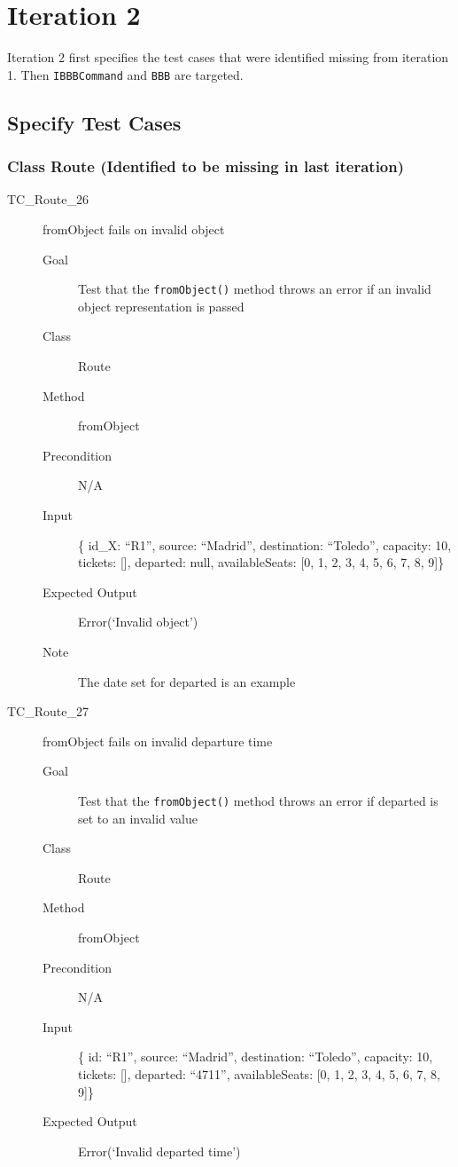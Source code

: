 \documentclass[11pt]{article}
\begin{document}
\section{Iteration 2}
\label{sec:org1440b24}

Iteration 2 first specifies the test cases that were identified missing from iteration 1. Then \texttt{IBBBCommand} and \texttt{BBB} are targeted.

\subsection{Specify Test Cases}
\label{sec:org25bcdb5}

\subsubsection{Class Route (Identified to be missing in last iteration)}
\label{sec:orgf850004}

\begin{description}
\item[{TC\_Route\_26}] fromObject fails on invalid object
\begin{description}
\item[{Goal}] Test that the \texttt{fromObject()} method throws an error if an invalid object representation is passed
\item[{Class}] Route
\item[{Method}] fromObject
\item[{Precondition}] N/A
\item[{Input}] \{ id\_X: “R1”, source: “Madrid”, destination: “Toledo”, capacity: 10,  tickets: [], departed: null, availableSeats: [0, 1, 2, 3, 4, 5, 6, 7, 8, 9]\}
\item[{Expected Output}] Error(‘Invalid object’)
\item[{Note}] The date set for departed is an example
\end{description}

\item[{TC\_Route\_27}] fromObject fails on invalid departure time
\begin{description}
\item[{Goal}] Test that the \texttt{fromObject()} method throws an error if departed is set to an invalid value
\item[{Class}] Route
\item[{Method}] fromObject
\item[{Precondition}] N/A
\item[{Input}] \{ id: “R1”, source: “Madrid”, destination: “Toledo”, capacity: 10,  tickets: [], departed: “4711”, availableSeats: [0, 1, 2, 3, 4, 5, 6, 7, 8, 9]\}
\item[{Expected Output}] Error(‘Invalid departed time’)
\end{description}
\end{description}
\end{document}
